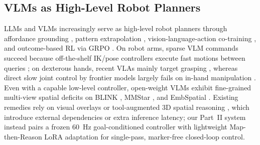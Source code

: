\subsection{VLMs as High-Level Robot Planners}
LLMs and VLMs increasingly serve as high-level robot planners through affordance grounding \citep{ichter2022saycan}, pattern extrapolation \citep{mirchandani2023llms}, vision-language-action co-training \citep{brohan2023rt2}, and outcome-based RL via GRPO \citep{shao2024deepseekmath,tang2026training}.
On robot arms, sparse VLM commands succeed because off-the-shelf IK/pose controllers execute fast motions between queries \citep{tang2026training}; on dexterous hands, recent VLAs mainly target grasping \citep{zhong2026dexgraspvla}, whereas direct slow joint control by frontier models largely fails on in-hand manipulation \citep{galbot2026astra}.
Even with a capable low-level controller, open-weight VLMs exhibit fine-grained multi-view spatial deficits on BLINK \citep{fu2024blink}, MMStar \citep{chen2024mmstar}, and EmbSpatial \citep{du2024embspatial}.
Existing remedies rely on visual overlays \citep{yang2023setofmark,nasiriany2024pivot} or tool-augmented 3D spatial reasoning \citep{zhang2026think3d,li2026skill3d}, which introduce external dependencies or extra inference latency; our Part~II system instead pairs a frozen 60~Hz goal-conditioned controller with lightweight Map-then-Reason LoRA adaptation for single-pass, marker-free closed-loop control.
